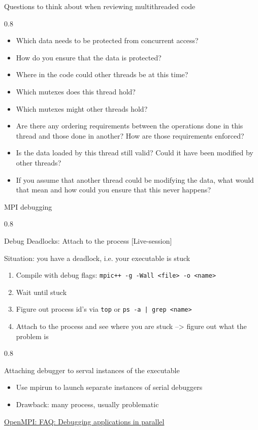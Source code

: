 \documentclass[aspectratio=1610]{beamer}
\newenvironment{centeredblock}[2][0.8\textwidth]
{ %
	\begin{center}
		\begin{varwidth}{#1} %
			\begin{block}{#2}
				\centering
			}
			{ %
			\end{block}
		\end{varwidth}
	\end{center}
}
\begin{document}
	\begin{frame}[fragile]{Questions to think about when reviewing multithreaded code}
		\begin{centeredblock}{}
			\begin{itemize}
				\item Which data needs to be protected from concurrent access?
				\item How do you ensure that the data is protected?
				\item Where in the code could other threads be at this time?
				\item Which mutexes does this thread hold?
				\item Which mutexes might other threads hold?
				\item Are there any ordering requirements between the operations done in this
				thread and those done in another? How are those requirements enforced?
				\item Is the data loaded by this thread still valid? Could it have been modified by
				other threads?
				\item If you assume that another thread could be modifying the data, what would that
				mean and how could you ensure that this never happens?
			\end{itemize}
		\end{centeredblock}
	\end{frame}
	
	\begin{frame}[fragile]{MPI debugging}
		\begin{centeredblock}{Debug Deadlocks: Attach to the process [Live-session]}
			Situation: you have a deadlock, i.e. your executable is stuck
			\begin{enumerate}
				\item Compile with debug flags: \texttt{mpic++ -g -Wall <file> -o <name>}
					\item Wait until stuck
					\item Figure out process id's via \texttt{top} or \texttt{ps -a | grep <name>}
					\item Attach to the process and see where you are stuck --> figure out what the problem is
			\end{enumerate}
		\end{centeredblock}
		\pause
		\begin{centeredblock}{Attaching debugger to serval instances of the executable}
			\begin{itemize}
				\item Use mpirun to launch separate instances of serial debuggers
				\item Drawback: many process, usually problematic
			\end{itemize}
			\href{https://www.open-mpi.org/faq/?category=debugging#serial-debuggers}{OpenMPI: FAQ: Debugging applications in parallel}
		\end{centeredblock}
	\end{frame}
	
\end{document}
